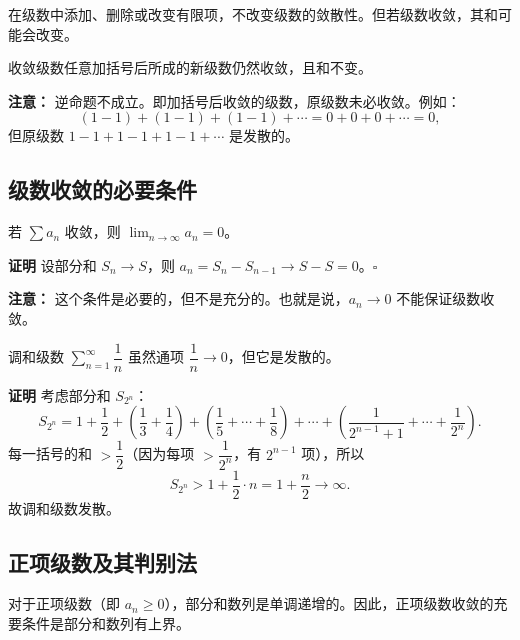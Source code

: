 \documentclass{ctexart}
\newenvironment{custom}[1]{\par\noindent \textbf{#1}\quad}{\par\vspace{1em}}
\begin{document}
\begin{example}[加减结构中的错误示例]
\begin{theorem}[添加或删除有限项]
在级数中添加、删除或改变有限项，不改变级数的敛散性。但若级数收敛，其和可能会改变。
\end{theorem}

\begin{theorem}[加括号]
收敛级数任意加括号后所成的新级数仍然收敛，且和不变。

\textbf{注意：} 逆命题不成立。即加括号后收敛的级数，原级数未必收敛。例如：
\[
(1-1)+(1-1)+(1-1)+\cdots = 0+0+0+\cdots = 0,
\]
但原级数 \(1-1+1-1+1-1+\cdots\) 是发散的。
\end{theorem}

\subsection{级数收敛的必要条件}

\begin{theorem}[级数收敛的必要条件]
若 \(\sum a_n\) 收敛，则 \(\lim_{n\to\infty} a_n = 0\)。
\end{theorem}

\begin{custom}{证明}
设部分和 \(S_n \to S\)，则 \(a_n = S_n - S_{n-1} \to S - S = 0\)。\(\square\)
\end{custom}

\textbf{注意：} 这个条件是必要的，但不是充分的。也就是说，\(a_n \to 0\) 不能保证级数收敛。

\begin{example}[调和级数]
调和级数 \(\sum_{n=1}^{\infty} \dfrac{1}{n}\) 虽然通项 \(\dfrac{1}{n} \to 0\)，但它是发散的。
\end{example}
\begin{custom}{证明}
考虑部分和 \(S_{2^n}\)：
\[
S_{2^n} = 1 + \dfrac12 + \left(\dfrac13+\dfrac14\right) + \left(\dfrac15+\cdots+\dfrac18\right) + \cdots + \left(\dfrac{1}{2^{n-1}+1} + \cdots + \dfrac{1}{2^n}\right).
\]
每一括号的和 \(> \dfrac12\)（因为每项 \(> \dfrac{1}{2^n}\)，有 \(2^{n-1}\) 项），所以
\[
S_{2^n} > 1 + \dfrac12 \cdot n = 1 + \dfrac{n}{2} \to \infty.
\]
故调和级数发散。
\end{custom}

\subsection{正项级数及其判别法}

对于正项级数（即 \(a_n \geq 0\)），部分和数列是单调递增的。因此，正项级数收敛的充要条件是部分和数列有上界。


\end{example}
\end{document}
